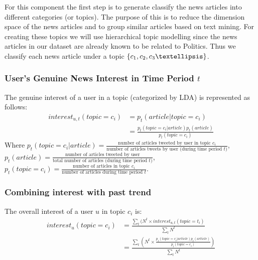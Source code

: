 \documentclass{article}
\begin{document}
For this component the first step is to generate classify the news articles into different categories (or topics). The purpose of this is to reduce the dimension space of the news articles and to group similar articles based on text mining. For creating these topics we will use hierarchical topic modelling since the news articles in our dataset are already known to be related to Politics. Thus we classify each news article under a topic $\{c_1, c_2, c_3 \textellipsis \}$. \\

\subsubsection{User’s Genuine News Interest in Time Period $t$}

The genuine interest of a user in a topic (categorized by LDA) is represented as follows:
\begin{equation}
\begin{aligned} 
interest_{u,t}(topic = c_i) 
& = p_t(article | topic = c_i) \\
& = \frac{p_t(topic = c_i| article) p_t(article)}{p_t(topic = c_i)}
\end{aligned}
\end{equation}
Where $p_t(topic = c_i| article) = \displaystyle \frac{\textrm{number of articles tweeted by user in topic $c_i$}}{\textrm{number of articles tweets by user (during time period $t$)}}$, \\
$p_t(article) = \displaystyle \frac{\textrm{number of articles tweeted by user}}{\textrm{total number of articles (during time period $t$)}}$, \\
$p_t(topic = c_i) = \displaystyle \frac{\textrm{number of articles in topic $c_i$}}{\textrm{number of articles during time period $t$}} $.


\subsubsection{Combining interest with past trend}

The overall interest of a user $u$ in topic $c_i$ is: \\
\begin{equation}
\begin{aligned}
interest_u(topic = c_i) 
& = \displaystyle \frac{\sum_{t}(N^t \times interest_{u,t}(topic = t_i)}{\sum_{t} N^t}	 \\
& = \displaystyle\frac{\sum_{t} \left(N^t \times \displaystyle\frac{p_t(topic = c_i| article) p_t(article)}{p_t(topic = c_i)}\right)}{\sum_{t} N^t} \\
\end{aligned}    
\end{equation}
\end{document}
